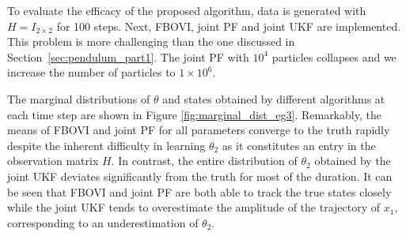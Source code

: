 \documentclass[preprint,3p,times]{elsarticle}
\begin{document}
To evaluate the efficacy of the proposed algorithm, data is generated with $H=I_{2\times2}$ for 100 steps. Next, FBOVI, joint PF and joint UKF are implemented. This problem is more challenging than the one discussed in Section~\ref{sec:pendulum_part1}. The joint PF with $10^4$ particles collapses and we increase the number of particles to $1\times 10^6$. 

The marginal distributions of $\theta$ and states obtained by different algorithms at each time step are shown in Figure \ref{fig:marginal_dist_eg3}. Remarkably, the means of FBOVI and joint PF for all parameters converge to the truth rapidly despite the inherent difficulty in learning $\theta_2$ as it constitutes an entry in the observation matrix $H$. In contrast, the entire distribution of $\theta_2$ obtained by the joint UKF deviates significantly from the truth for most of the duration. It can be seen that FBOVI and joint PF are both able to track the true states closely while the joint UKF tends to overestimate the amplitude of the trajectory of $x_1$, corresponding to an underestimation of $\theta_2$.
\end{document}
